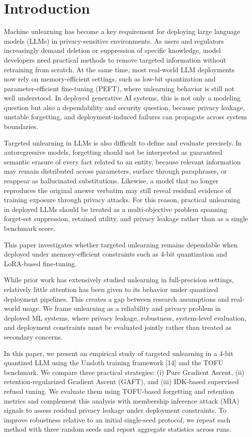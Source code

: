 \documentclass[conference]{IEEEtran}
\begin{document}
\section{Introduction}
Machine unlearning has become a key requirement for deploying large language models (LLMs) in privacy-sensitive environments. As users and regulators increasingly demand deletion or suppression of specific knowledge, model developers need practical methods to remove targeted information without retraining from scratch. At the same time, most real-world LLM deployments now rely on memory-efficient settings, such as low-bit quantization and parameter-efficient fine-tuning (PEFT), where unlearning behavior is still not well understood. In deployed generative AI systems, this is not only a modeling question but also a dependability and security question, because privacy leakage, unstable forgetting, and deployment-induced failures can propagate across system boundaries.

Targeted unlearning in LLMs is also difficult to define and evaluate precisely. In autoregressive models, forgetting should not be interpreted as guaranteed semantic erasure of every fact related to an entity, because relevant information may remain distributed across parameters, surface through paraphrases, or reappear as hallucinated substitutions. Likewise, a model that no longer reproduces the original answer verbatim may still reveal residual evidence of training exposure through privacy attacks. For this reason, practical unlearning in deployed LLMs should be treated as a multi-objective problem spanning forget-set suppression, retained utility, and privacy leakage rather than as a single benchmark score.

This paper investigates whether targeted unlearning remains dependable when deployed under memory-efficient constraints such as 4-bit quantization and LoRA-based fine-tuning.

While prior work has extensively studied unlearning in full-precision settings, relatively little attention has been given to its behavior under quantized deployment pipelines. This creates a gap between research assumptions and real-world usage. We frame unlearning as a reliability and privacy problem in deployed ML systems, where privacy leakage, robustness, system-level evaluation, and deployment constraints must be evaluated jointly rather than treated as secondary concerns.

In this paper, we present an empirical study of targeted unlearning in a 4-bit quantized LLM using the Unsloth training framework [14] and the TOFU benchmark. We compare three practical strategies: (i) Pure Gradient Ascent, (ii) retention-regularized Gradient Ascent (GAFT), and (iii) IDK-based supervised refusal tuning. We evaluate them using TOFU-based forgetting and retention metrics and complement this analysis with membership inference attack (MIA) signals to assess residual privacy leakage under deployment constraints. To improve robustness relative to an initial single-seed protocol, we repeat each method with three random seeds and report aggregate statistics across runs.
\end{document}
